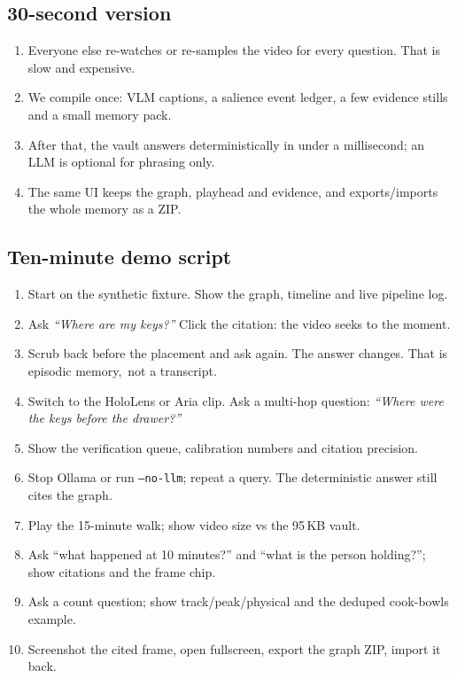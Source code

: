 \documentclass[10pt,a4paper]{article}
\newcommand{\code}[1]{\texttt{\small #1}}
\begin{document}
\subsection*{30-second version}

\begin{enumerate}[leftmargin=1.25em,itemsep=1pt]
  \item Everyone else re-watches or re-samples the video for every question. That is slow and expensive.
  \item We compile once: VLM captions, a salience event ledger, a few evidence stills and a small memory pack.
  \item After that, the vault answers deterministically in under a millisecond; an LLM is optional for phrasing only.
  \item The same UI keeps the graph, playhead and evidence, and exports/imports the whole memory as a ZIP.
\end{enumerate}

\subsection*{Ten-minute demo script}

\begin{enumerate}[leftmargin=1.25em,itemsep=1pt]
  \item Start on the synthetic fixture. Show the graph, timeline and live pipeline log.
  \item Ask \emph{``Where are my keys?''} Click the citation: the video seeks to the moment.
  \item Scrub back before the placement and ask again. The answer changes. That is episodic memory,\ not a transcript.
  \item Switch to the HoloLens or Aria clip. Ask a multi-hop question:
        \emph{``Where were the keys before the drawer?''}
  \item Show the verification queue, calibration numbers and citation precision.
  \item Stop Ollama or run \code{--no-llm}; repeat a query. The deterministic answer still cites the graph.
  \item Play the 15-minute walk; show video size vs the 95\,KB vault.
  \item Ask ``what happened at 10 minutes?'' and ``what is the person holding?''; show citations and the frame chip.
  \item Ask a count question; show track/peak/physical and the deduped cook-bowls example.
  \item Screenshot the cited frame, open fullscreen, export the graph ZIP, import it back.
\end{enumerate}
\end{document}
